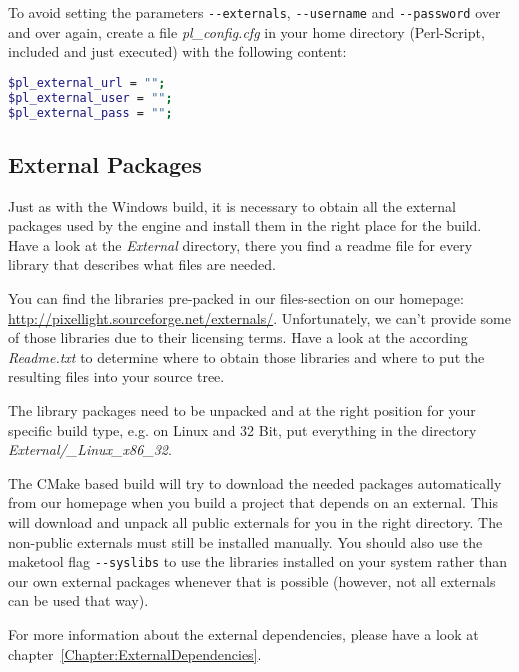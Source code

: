 To avoid setting the parameters \verb+--externals+, \verb+--username+ and \verb+--password+ over and over again, create a file \emph{pl\_config.cfg} in your home directory (Perl-Script, included and just executed) with the following content:
\begin{lstlisting}[language=bash]
$pl_external_url = "";
$pl_external_user = "";
$pl_external_pass = "";
\end{lstlisting}



\subsection{External Packages}
Just as with the Windows build, it is necessary to obtain all the external packages used by the engine and install them in the right place for the build. Have a look at the \emph{External} directory, there you find a readme file for every library that describes what files are needed.

You can find the libraries pre-packed in our files-section on our homepage: \url{http://pixellight.sourceforge.net/externals/}. Unfortunately, we can't provide some of those libraries due to their licensing terms. Have a look at the according \emph{Readme.txt} to determine where to obtain those libraries and where to put the resulting files into your source tree.

The library packages need to be unpacked and at the right position for your specific build type, e.g. on Linux and 32 Bit, put everything in the directory \emph{External/\_Linux\_x86\_32}.

The CMake based build will try to download the needed packages automatically from our homepage when you build a project that depends on an external. This will download and unpack all public externals for you in the right directory. The non-public externals must still be installed manually. You should also use the maketool flag \verb+--syslibs+ to use the libraries installed on your system rather than our own external packages whenever that is possible (however, not all externals can be used that way).

For more information about the external dependencies, please have a look at chapter~\ref{Chapter:ExternalDependencies}.




